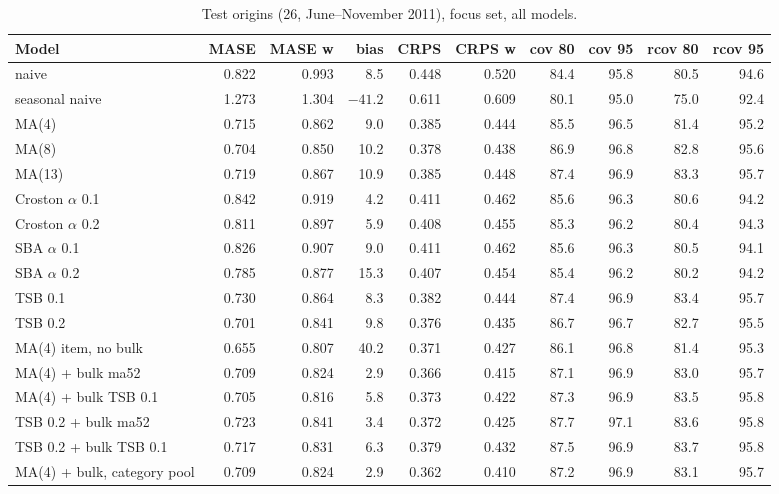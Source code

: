 \documentclass[11pt,a4paper]{article}
\begin{document}
\begin{table}[ht]
  \centering
  \footnotesize
  \setlength{\tabcolsep}{4pt}
  \caption{Test origins (26, June--November 2011), focus set, all models.}
  \label{tab:test-focus}
  \begin{tabular}{l rrrrr rrrr}
    \toprule
    Model & MASE & MASE w & bias & CRPS & CRPS w & cov 80 & cov 95 & rcov 80 & rcov 95 \\
    \midrule
    naive & 0.822 & 0.993 & 8.5 & 0.448 & 0.520 & 84.4 & 95.8 & 80.5 & 94.6 \\
    seasonal naive & 1.273 & 1.304 & $-41.2$ & 0.611 & 0.609 & 80.1 & 95.0 & 75.0 & 92.4 \\
    MA(4) & 0.715 & 0.862 & 9.0 & 0.385 & 0.444 & 85.5 & 96.5 & 81.4 & 95.2 \\
    MA(8) & 0.704 & 0.850 & 10.2 & 0.378 & 0.438 & 86.9 & 96.8 & 82.8 & 95.6 \\
    MA(13) & 0.719 & 0.867 & 10.9 & 0.385 & 0.448 & 87.4 & 96.9 & 83.3 & 95.7 \\
    Croston $\alpha$ 0.1 & 0.842 & 0.919 & 4.2 & 0.411 & 0.462 & 85.6 & 96.3 & 80.6 & 94.2 \\
    Croston $\alpha$ 0.2 & 0.811 & 0.897 & 5.9 & 0.408 & 0.455 & 85.3 & 96.2 & 80.4 & 94.3 \\
    SBA $\alpha$ 0.1 & 0.826 & 0.907 & 9.0 & 0.411 & 0.462 & 85.6 & 96.3 & 80.5 & 94.1 \\
    SBA $\alpha$ 0.2 & 0.785 & 0.877 & 15.3 & 0.407 & 0.454 & 85.4 & 96.2 & 80.2 & 94.2 \\
    TSB 0.1 & 0.730 & 0.864 & 8.3 & 0.382 & 0.444 & 87.4 & 96.9 & 83.4 & 95.7 \\
    TSB 0.2 & 0.701 & 0.841 & 9.8 & 0.376 & 0.435 & 86.7 & 96.7 & 82.7 & 95.5 \\
    MA(4) item, no bulk & 0.655 & 0.807 & 40.2 & 0.371 & 0.427 & 86.1 & 96.8 & 81.4 & 95.3 \\
    MA(4) + bulk ma52 & 0.709 & 0.824 & 2.9 & 0.366 & 0.415 & 87.1 & 96.9 & 83.0 & 95.7 \\
    MA(4) + bulk TSB 0.1 & 0.705 & 0.816 & 5.8 & 0.373 & 0.422 & 87.3 & 96.9 & 83.5 & 95.8 \\
    TSB 0.2 + bulk ma52 & 0.723 & 0.841 & 3.4 & 0.372 & 0.425 & 87.7 & 97.1 & 83.6 & 95.8 \\
    TSB 0.2 + bulk TSB 0.1 & 0.717 & 0.831 & 6.3 & 0.379 & 0.432 & 87.5 & 96.9 & 83.7 & 95.8 \\
    MA(4) + bulk, category pool & 0.709 & 0.824 & 2.9 & 0.362 & 0.410 & 87.2 & 96.9 & 83.1 & 95.7 \\

\end{tabular}
\end{table}
\end{document}

